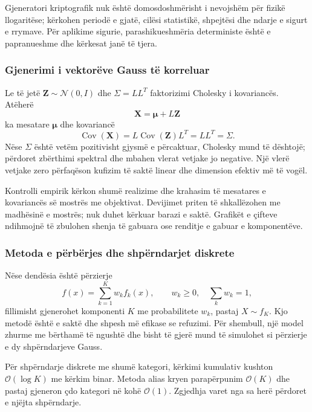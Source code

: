 \documentclass[11pt,oneside,openany]{book}
\newcommand{\vect}[1]{\bm{#1}}
\newcommand{\Cov}{\operatorname{Cov}}
\newcommand{\Oh}{\mathcal{O}}
\begin{document}
Gjeneratori kriptografik nuk është domosdoshmërisht i nevojshëm për fizikë llogaritëse; kërkohen periodë e gjatë, cilësi statistikë, shpejtësi dhe ndarje e sigurt e rrymave. Për aplikime sigurie, parashikueshmëria deterministe është e papranueshme dhe kërkesat janë të tjera.

\subsubsection{Gjenerimi i vektorëve Gauss të korreluar}
Le të jetë $\vect Z\sim\mathcal N(0,I)$ dhe $\Sigma=LL^T$ faktorizimi Cholesky i kovariancës. Atëherë
\begin{equation}
 \vect X=\vect\mu+L\vect Z
\end{equation}
ka mesatare $\vect\mu$ dhe kovariancë
\begin{equation}
 \Cov(\vect X)=L\Cov(\vect Z)L^T=LL^T=\Sigma.
\end{equation}
Nëse $\Sigma$ është vetëm pozitivisht gjysmë e përcaktuar, Cholesky mund të dështojë; përdoret zbërthimi spektral dhe mbahen vlerat vetjake jo negative. Një vlerë vetjake zero përfaqëson kufizim të saktë linear dhe dimension efektiv më të vogël.

Kontrolli empirik kërkon shumë realizime dhe krahasim të mesatares e kovariancës së mostrës me objektivat. Devijimet priten të shkallëzohen me madhësinë e mostrës; nuk duhet kërkuar barazi e saktë. Grafikët e çifteve ndihmojnë të zbulohen shenja të gabuara ose renditje e gabuar e komponentëve.

\subsubsection{Metoda e përbërjes dhe shpërndarjet diskrete}
Nëse dendësia është përzierje
\begin{equation}
 f(x)=\sum_{k=1}^{K}w_kf_k(x),\qquad w_k\ge0,\quad\sum_kw_k=1,
\end{equation}
fillimisht gjenerohet komponenti $K$ me probabilitete $w_k$, pastaj $X\sim f_K$. Kjo metodë është e saktë dhe shpesh më efikase se refuzimi. Për shembull, një model zhurme me bërthamë të ngushtë dhe bisht të gjerë mund të simulohet si përzierje e dy shpërndarjeve Gauss.

Për shpërndarje diskrete me shumë kategori, kërkimi kumulativ kushton $\Oh(\log K)$ me kërkim binar. Metoda alias kryen parapërpunim $\Oh(K)$ dhe pastaj gjeneron çdo kategori në kohë $\Oh(1)$. Zgjedhja varet nga sa herë përdoret e njëjta shpërndarje.
\end{document}

